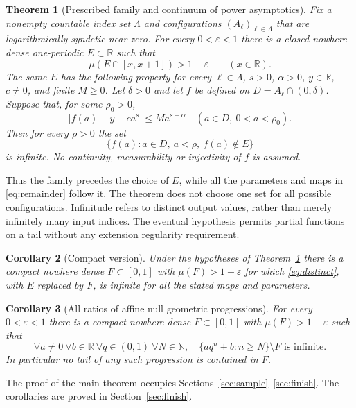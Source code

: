 \documentclass[11pt]{article}
\newtheorem{theorem}{Theorem}[section]
\newtheorem{corollary}[theorem]{Corollary}
\theoremstyle{definition}
\theoremstyle{remark}
\newcommand{\R}{\mathbb R}
\newcommand{\N}{\mathbb N}
\begin{document}
\begin{theorem}[Prescribed family and continuum of power asymptotics]
\label{thm:main}
Fix a nonempty countable index set $\Lambda$ and configurations
$(A_\ell)_{\ell\in\Lambda}$ that are logarithmically syndetic near zero.
For every $0<\varepsilon<1$ there is a closed nowhere dense one-periodic
$E\subset\R$ such that
\begin{equation}\label{eq:density}
 \mu(E\cap[x,x+1])>1-\varepsilon\qquad(x\in\R).
\end{equation}
The same $E$ has the following property for every $\ell\in\Lambda$,
$s>0$, $\alpha>0$, $y\in\R$, $c\ne0$, and finite $M\geq0$.
Let $\delta>0$ and let $f$ be defined on
$D=A_\ell\cap(0,\delta)$. Suppose that, for some $\rho_0>0$,
\begin{equation}\label{eq:remainder}
 |f(a)-y-ca^s|\leq M a^{s+\alpha}
 \quad(a\in D,\ 0<a<\rho_0).
\end{equation}
Then for every $\rho>0$ the set
\begin{equation}\label{eq:distinct}
 \{f(a):a\in D,\ a<\rho,\ f(a)\notin E\}
\end{equation}
is infinite. No continuity, measurability or injectivity of $f$ is assumed.
\end{theorem}
Thus the family precedes the choice of $E$, while all the parameters and maps
in \eqref{eq:remainder} follow it. The theorem does not choose one set for all
possible configurations. Infinitude refers to distinct output values, rather
than merely infinitely many input indices. The eventual hypothesis permits
partial functions on a tail without any extension regularity requirement.

\begin{corollary}[Compact version]\label{cor:compact}
Under the hypotheses of Theorem~\ref{thm:main} there is a compact nowhere dense
$F\subset[0,1]$ with $\mu(F)>1-\varepsilon$ for which \eqref{eq:distinct}, with
$E$ replaced by $F$, is infinite for all the stated maps and parameters.
\end{corollary}
\begin{corollary}[All ratios of affine null geometric progressions]
\label{cor:geometric}
For every $0<\varepsilon<1$ there is a compact nowhere dense $F\subset[0,1]$
with $\mu(F)>1-\varepsilon$ such that
\[
 \forall a\ne0\ \forall b\in\R\ \forall q\in(0,1)\ \forall N\in\N,
 \quad\{a q^n+b:n\geq N\}\setminus F\text{ is infinite}.
\]
In particular no tail of any such progression is contained in $F$.
\end{corollary}
The proof of the main theorem occupies Sections~\ref{sec:sample}--\ref{sec:finish}.
The corollaries are proved in Section~\ref{sec:finish}.
\end{document}
